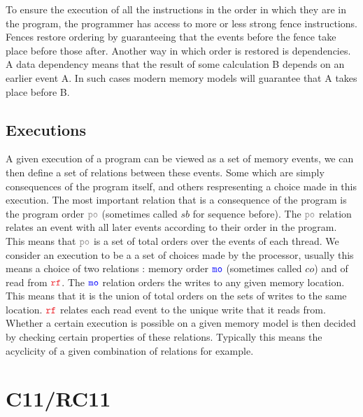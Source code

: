 \documentclass[a4,11pt,dvipsnames]{article}
\begin{document}
To ensure the execution of all the instructions in the order in which they are in the program, the programmer has access to more or less strong fence instructions. Fences restore ordering by guaranteeing that the events before the fence take place before those after. Another way in which order is restored is dependencies. A data dependency means that the result of some calculation B depends on an earlier event A. In such cases modern memory models will guarantee that A takes place before B.%

\subsection{Executions}

A given execution of a program can be viewed as a set of memory events, we can then define a set of relations between these events. Some which are simply consequences of the program itself, and others respresenting a choice made in this execution. The most important relation that is a consequence of the program is the program order $\po$ (sometimes called $sb$ for sequence before). The $\po$ relation relates an event with all later events according to their order in the program. This means that $\po$ is a set of total orders over the events of each thread. We consider an execution to be a a set of choices made by the processor, usually this means a choice of two relations : memory order $\texttt{\color{blue}mo}$ (sometimes called $co$) and of read from $\rf$. The $\texttt{\color{blue}mo}$ relation orders the writes to any given memory location. This means that it is the union of total orders on the sets of writes to the same location. $\rf$ relates each read event to the unique write that it reads from. Whether a certain execution is possible on a given memory model is then decided by checking certain properties of these relations. Typically this means the acyclicity of a given combination of relations for example.

\vfill

\section{C11/RC11}
\end{document}
